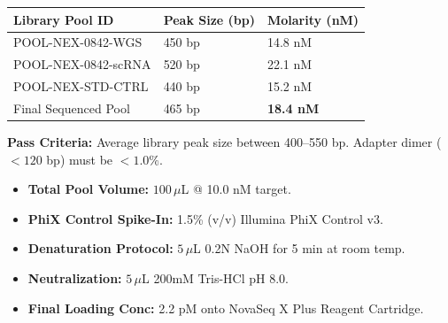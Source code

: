 \documentclass[10pt,a4paper]{article}
\begin{document}
\begin{minipage}[t]{0.48\linewidth}
  \begin{tcolorbox}[
    title={\small\bfseries\faMicroscope\ Fragment Size Distribution (TapeStation 4200)},
    colback=white,
    colframe=PrimaryBlue,
    coltitle=white,
    arc=2pt,
    boxrule=0.5pt,
    top=4pt, bottom=4pt, left=6pt, right=6pt
  ]
    \fontsize{8pt}{10.5pt}\selectfont
    \begin{tabular}{@{}l l l@{}}
      \textbf{Library Pool ID} & \textbf{Peak Size (bp)} & \textbf{Molarity (nM)} \\
      \hline
      POOL-NEX-0842-WGS & 450 bp & 14.8 nM \\
      POOL-NEX-0842-scRNA & 520 bp & 22.1 nM \\
      POOL-NEX-STD-CTRL & 440 bp & 15.2 nM \\
      Final Sequenced Pool & 465 bp & \textbf{18.4 nM} \\
    \end{tabular}
    \vspace{4pt}

    {\color{DarkText}\textbf{Pass Criteria:} Average library peak size between 400--550 bp. Adapter dimer ($<120$ bp) must be $<1.0\%$.}
  \end{tcolorbox}
\end{minipage}%
\hfill
\begin{minipage}[t]{0.48\linewidth}
  \begin{tcolorbox}[
    title={\small\bfseries\faFlask\ Final Pooling \& PhiX Control Setup},
    colback=white,
    colframe=TealAccent,
    coltitle=white,
    arc=2pt,
    boxrule=0.5pt,
    top=4pt, bottom=4pt, left=6pt, right=6pt
  ]
    \fontsize{8pt}{10.5pt}\selectfont
    \begin{itemize}[leftmargin=12pt, itemsep=3pt]
      \item \textbf{Total Pool Volume:} $100\,\mu$L @ 10.0 nM target.
      \item \textbf{PhiX Control Spike-In:} 1.5\% (v/v) Illumina PhiX Control v3.
      \item \textbf{Denaturation Protocol:} $5\,\mu$L 0.2N NaOH for 5 min at room temp.
      \item \textbf{Neutralization:} $5\,\mu$L 200mM Tris-HCl pH 8.0.
      \item \textbf{Final Loading Conc:} 2.2 pM onto NovaSeq X Plus Reagent Cartridge.
    \end{itemize}
  \end{tcolorbox}
\end{minipage}
\end{document}
